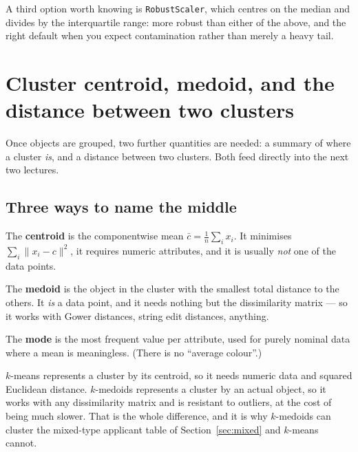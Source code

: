 \documentclass[11pt]{article}
\begin{document}
A third option worth knowing is \texttt{RobustScaler}, which centres on the
median and divides by the interquartile range: more robust than either of the
above, and the right default when you expect contamination rather than merely
a heavy tail.

\section{Cluster centroid, medoid, and the distance between two clusters}
\label{sec:centroid}

Once objects are grouped, two further quantities are needed: a summary of
where a cluster \emph{is}, and a distance between two clusters. Both feed
directly into the next two lectures.

\subsection{Three ways to name the middle}

The \textbf{centroid} is the componentwise mean
$\bar{c} = \frac1n \sum_i x_i$. It minimises $\sum_i \|x_i - c\|^2$, it
requires numeric attributes, and it is usually \emph{not} one of the data
points.

The \textbf{medoid} is the object in the cluster with the smallest total
distance to the others. It \emph{is} a data point, and it needs nothing but
the dissimilarity matrix --- so it works with Gower distances, string edit
distances, anything.

The \textbf{mode} is the most frequent value per attribute, used for purely
nominal data where a mean is meaningless. (There is no ``average colour''.)

\begin{keyidea}
$k$-means represents a cluster by its centroid, so it needs numeric data and
squared Euclidean distance. $k$-medoids represents a cluster by an actual
object, so it works with any dissimilarity matrix and is resistant to
outliers, at the cost of being much slower. That is the whole difference, and
it is why $k$-medoids can cluster the mixed-type applicant table of
Section~\ref{sec:mixed} and $k$-means cannot.
\end{keyidea}
\end{document}
